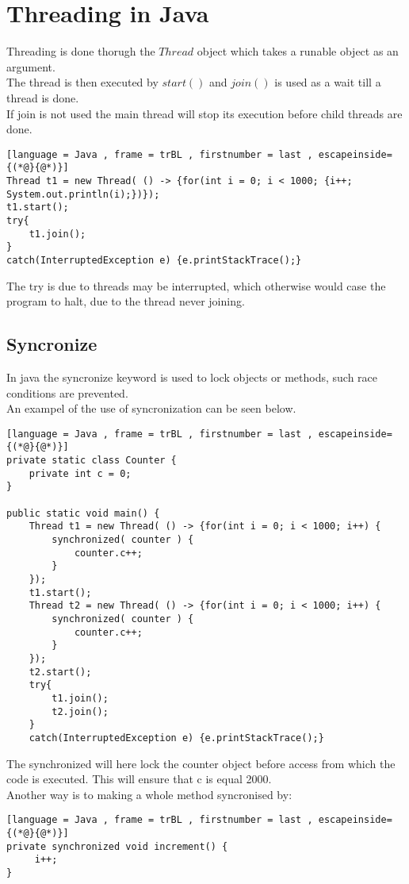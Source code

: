 \documentclass[12pt, a4paper]{article}
\begin{document}
\section{Threading in Java}
	Threading is done thorugh the $Thread$ object which takes a runable object as an argument.\\
	The thread is then executed by $start()$ and $join()$ is used as a wait till a thread is done.\\
	If join is not used the main thread will stop its execution before child threads are done.\\
\begin{lstlisting}[language = Java , frame = trBL , firstnumber = last , escapeinside={(*@}{@*)}]
Thread t1 = new Thread( () -> {for(int i = 0; i < 1000; {i++; System.out.println(i);})});
t1.start();
try{
	t1.join();
}
catch(InterruptedException e) {e.printStackTrace();}
\end{lstlisting}
	The try is due to threads may be interrupted, which otherwise would case the program to halt, due to the thread never joining.\\

	\subsection{Syncronize}
		In java the syncronize keyword is used to lock objects or methods, such race conditions are prevented.\\
		An exampel of the use of syncronization can be seen below.
\begin{lstlisting}[language = Java , frame = trBL , firstnumber = last , escapeinside={(*@}{@*)}]
private static class Counter {
	private int c = 0;
}

public static void main() {
	Thread t1 = new Thread( () -> {for(int i = 0; i < 1000; i++) {
		synchronized( counter ) {
			counter.c++;
		}
	});
	t1.start();
	Thread t2 = new Thread( () -> {for(int i = 0; i < 1000; i++) {
		synchronized( counter ) {
			counter.c++;
		}
	});
	t2.start();
	try{
		t1.join();
		t2.join();
	}
	catch(InterruptedException e) {e.printStackTrace();}
\end{lstlisting}	
	The synchronized will here lock the counter object before access from which the code is executed. This will ensure that c is equal 2000.\\
	Another way is to making a whole method syncronised by:
	\begin{lstlisting}[language = Java , frame = trBL , firstnumber = last , escapeinside={(*@}{@*)}]
private synchronized void increment() {
	 i++;
}
\end{lstlisting}
\end{document}
